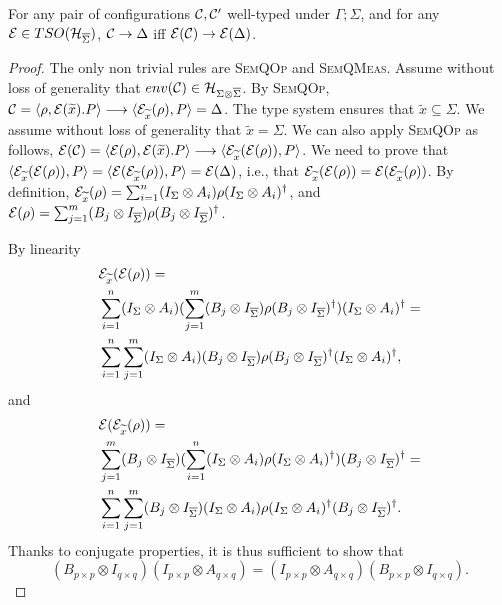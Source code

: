 \begin{proposition}\label{lemma:sop}
	For any pair of configurations $\mathcal{C}, \mathcal{C}'$ well-typed under $\Gamma; \Sigma$, and for any $\mathcal{E} \in TSO(\mathcal{H}_{\overline{\Sigma}})$,
	$\mathcal{C} \rightarrow \Delta$ iff $\mathcal{E}(\mathcal{C}) \rightarrow \mathcal{E}(\Delta)$.
\end{proposition}
\begin{proof}
	The only non trivial rules are {\scshape SemQOp} and {\scshape SemQMeas}.
	Assume without loss of generality that $env(\mathcal{C}) \in \mathcal{H}_{\Sigma \otimes \overline{\Sigma}}$.
	By {\scshape SemQOp}, $\mathcal{C} = \langle \rho, \mathcal{E}(\widetilde{x}) . P \rangle \longrightarrow \langle \mathcal{E}_{\widetilde{x}}(\rho), P \rangle = \Delta$.
	The type system ensures that $\tilde{x} \subseteq \Sigma$.
	We assume without loss of generality that $\tilde{x} = \Sigma$.
	We can also apply {\scshape SemQOp} as follows, $\mathcal{E}(\mathcal{C}) = \langle \mathcal{E}(\rho), \mathcal{E}(\widetilde{x}) . P \rangle  \longrightarrow \langle \mathcal{E}_{\widetilde{x}}(\mathcal{E}(\rho)), P \rangle$.
	We need to prove that $\langle \mathcal{E}_{\widetilde{x}}(\mathcal{E}(\rho)), P \rangle = \langle \mathcal{E}(\mathcal{E}_{\widetilde{x}}(\rho)), P \rangle = \mathcal{E}(\Delta)$, i.e., that $\mathcal{E}_{\widetilde{x}}(\mathcal{E}(\rho)) = \mathcal{E}(\mathcal{E}_{\widetilde{x}}(\rho))$.
	By definition, $\mathcal{E}_{\widetilde{x}}(\rho) = \sum_{i = 1}^{n} (I_{\Sigma} \otimes A_i) \rho (I_{\Sigma} \otimes A_i)^{\dagger}$, and $\mathcal{E}(\rho) = \sum_{j = 1}^{m} (B_j \otimes I_{\overline{\Sigma}}) \rho (B_j \otimes I_{\overline{\Sigma}})^{\dagger}$.

	By linearity 
	\begin{align*}
	&\mathcal{E}_{\widetilde{x}}(\mathcal{E}(\rho)) =\\ 
	&\sum_{i = 1}^{n} (I_{\Sigma} \otimes A_i) (\sum_{j = 1}^{m} (B_j \otimes I_{\overline{\Sigma}}) \rho (B_j \otimes I_{\overline{\Sigma}})^{\dagger}) (I_{\Sigma} \otimes A_i)^{\dagger} =\\
	&\sum_{i = 1}^{n} \sum_{j = 1}^{m} (I_{\Sigma} \otimes A_i) (B_j \otimes I_{\overline{\Sigma}}) \rho (B_j \otimes I_{\overline{\Sigma}})^{\dagger} (I_{\Sigma} \otimes A_i)^{\dagger},
	\end{align*}
	and
	\begin{align*}
	&\mathcal{E}(\mathcal{E}_{\widetilde{x}}(\rho)) =\\
	&\sum_{j = 1}^{m} (B_j \otimes I_{\overline{\Sigma}}) (\sum_{i = 1}^{n} (I_{\Sigma} \otimes A_i) \rho (I_{\Sigma} \otimes A_i)^{\dagger}) (B_j \otimes I_{\overline{\Sigma}})^{\dagger} =\\
	&\sum_{i = 1}^{n} \sum_{j = 1}^{m} (B_j \otimes I_{\overline{\Sigma}}) (I_{\Sigma} \otimes A_i) \rho (I_{\Sigma} \otimes A_i)^{\dagger} (B_j \otimes I_{\overline{\Sigma}})^{\dagger}.
	\end{align*}
	Thanks to conjugate properties, it is thus sufficient to show that
	\[
	(B_{p\times p} \otimes I_{q\times q}) (I_{p\times p} \otimes A_{q\times q}) = (I_{p\times p} \otimes A_{q\times q}) (B_{p\times p} \otimes I_{q\times q}).
	\]
	

\end{proof}
